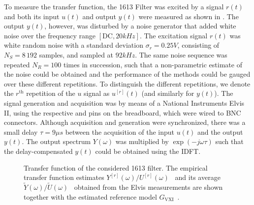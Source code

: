 To measure the transfer function, the \BK{} 1613 Filter was excited by a signal $r(t)$ and both its input $u(t)$ and output $y(t)$ were measured as shown in .
The output $y(t)$, however, was disturbed by a noise generator that added white noise over the frequency range $[\mathrm{DC}, 20\unit{kHz}]$.
The excitation signal $r(t)$ was white random noise with a standard deviation $\sigma_r = 0.25 \unit{V}$, consisting of $N_S = 8\,192$ samples, and sampled at $92 \unit{kHz}$.
The same noise sequence was repeated $N_R = 100$ times in succession, such that a non-parametric estimate of the noise could be obtained and the performance of the methods could be gauged over these different repetitions.
To distinguish the different repetitions, we denote the $r^{\text{th}}$ repetition of the $u$ signal as $u^{[r]}(t)$ (and similarly for $y(t)$).
The signal generation and acquisition was by means of a National Instruments Elvis II, using the respective  and  pins on the breadboard, which were wired to BNC connectors.
Although acquisition and generation were synchronized, there was a small delay $\tau = 9\unit{\mu s}$ between the acquisition of the input $u(t)$ and the output $y(t)$.
The output spectrum $Y(\omega)$ was multiplied by $\exp\left(-j\omega\tau \right)$ such that the delay-compensated $y(t)$ could be obtained using the \gls{IDFT}.

\begin{figure}
  \centering
  \setlength{\figurewidth}{0.75\columnwidth}
  \setlength{\figureheight}{0.68\figurewidth}
  
  \caption[\BK{} 1613 filter transfer function]{Transfer function of the considered \BK{} 1613 filter.
  The empirical transfer function estimates $Y^{[r]}(\omega)/U^{[r]}(\omega)$~ and its average $\tilde{Y}(\omega)/\tilde{U}(\omega)$~ obtained from the Elvis measurements are shown together with the estimated reference model $G_{\mathrm{VXI}}$~.} 
  \label{fig:bk1613}
\end{figure}


